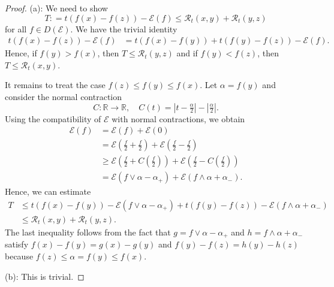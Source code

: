 \documentclass[10pt,a4paper]{amsart}
\newcommand{\R}{{\mathbb R}}
\newcommand{\cE}{{\mathcal E}}
\newcommand{\cR}{{\mathcal R}}
\begin{document}
\begin{proof}
 (a):  We need to show
 $$ T: = t(f(x) - f(z)) - \mathcal{E}(f) \leq \mathcal{R}_t(x,y) + \mathcal{R}_t(y,z) $$
 for all $f \in D(\cE)$. We have the trivial identity
  \begin{align*}
 t(f(x) - f(z)) - \mathcal{E}(f)  & = t(f(x) - f(y)) + t(f(y) -  f(z)) - \mathcal{E}(f).
 \end{align*}
 Hence, if $f(y) > f(x)$, then $T \leq \cR_t(y,z)$ and if $f(y) < f(z)$, then $T \leq \cR_t(x,y)$.
 
 It remains to treat the case $f(z) \leq f(y) \leq f(x)$.  Let $\alpha = f(y)$ and consider the normal contraction 
   $$ C\colon \R\to\R, \quad C(t) = |t - \tfrac{\alpha}{2}| - |\tfrac{\alpha}{2}|. $$
 Using the compatibility of $\cE$ with normal contractions, we obtain
 \begin{align*}
  \mathcal{E}(f) & = \mathcal{E}(f) + \mathcal{E}(0) \\
                 & = \mathcal{E}(\tfrac{f}{2} + \tfrac{f}{2}) + \mathcal{E}(\tfrac{f}{2} - \tfrac{f}{2}) \\
                 & \geq \mathcal{E}(\tfrac{f}{2} + C(\tfrac{f}{2})) + \mathcal{E}(\tfrac{f}{2} - C(\tfrac{f}{2})) \\
                 & = \mathcal{E}(f\vee \alpha - \alpha_+) + \mathcal{E}(f\wedge \alpha + \alpha_-).
 \end{align*}
 Hence, we can estimate 
 \begin{align*}
  T & \leq  t(f(x) - f(y)) - \mathcal{E}(f\vee \alpha - \alpha_+)   + t(f(y) - f(z)) - \mathcal{E}(f\wedge \alpha + \alpha_-) \\
    & \leq \mathcal{R}_t(x,y) + \mathcal{R}_t(y,z).
 \end{align*}
%
The last inequality follows from the fact that $g = f \vee \alpha - \alpha_+$ and $h = f\wedge \alpha + \alpha_-$  satisfy $f(x) - f(y) = g(x) - g(y)$ and $f(y) - f(z) = h(y) - h(z)$ because $f(z) \leq \alpha = f(y) \leq f(x)$. 
%

(b): This is trivial.


\end{proof}
\end{document}
